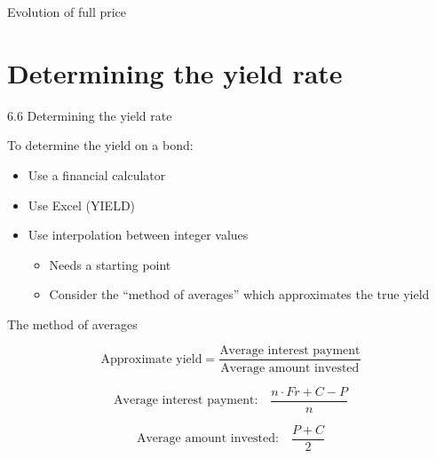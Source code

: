 \documentclass{beamer}
\begin{document}
\begin{frame}{Evolution of full price}

\begin{center}
\end{center}

\end{frame}

\setcounter{section}{5}
\section{Determining the yield rate}

\begin{frame}{6.6 Determining the yield rate}

To determine the yield on a bond:
\begin{itemize}
\item Use a financial calculator
\item Use Excel (YIELD)
\item Use interpolation between integer values
  \begin{itemize}
  \item Needs a starting point
  \item Consider the ``method of averages'' which approximates the true yield
  \end{itemize}
\end{itemize}

\end{frame}

\begin{frame}{The method of averages}

\[
\text{Approximate yield} = \frac{\text{Average interest payment}}{\text{Average amount invested}}
\]

\bigskip
\[
\text{Average interest payment:} \quad \frac{n \cdot Fr + C - P}{n}
\]

\bigskip
\[
\text{Average amount invested:} \quad \frac{P + C}{2}
\]

\end{frame}
\end{document}
